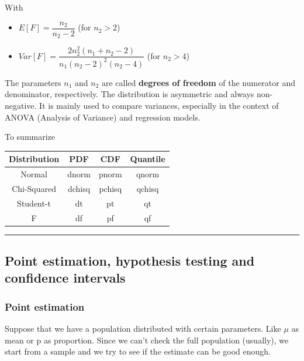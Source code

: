 With
\begin{itemize}
    \item $E[F] = \dfrac{n_2}{n_2 - 2}$ \quad (for $n_2 > 2$)
    \item $Var[F] = \dfrac{2n_2^2 (n_1 + n_2 - 2)}{n_1 (n_2 - 2)^2 (n_2 - 4)}$ \quad (for $n_2 > 4$)
\end{itemize}

The parameters $n_1$ and $n_2$ are called \textbf{degrees of freedom} of the numerator and denominator, respectively.  
The distribution is asymmetric and always non-negative.  
It is mainly used to compare variances, especially in the context of ANOVA (Analysis of Variance) and regression models.


\vspace{10pt}

To summarize

\begin{table}[h]
    \centering
    \begin{tabular}{|c|c|c|c|} %
        \hline %
        \textbf{Distribution} & \textbf{PDF}  & \textbf{CDF}  & \textbf{Quantile} \\
        \hline %
        Normal & dnorm & pnorm & qnorm \\
        \hline
        Chi-Squared & dchisq & pchisq & qchisq \\
        \hline
        Student-t & dt & pt & qt \\
        \hline
        F & df & pf & qf \\
        \hline %
    \end{tabular}
    \label{tab:distributions}
\end{table}

\vspace{10pt}

\hrule

\vspace{10pt}



\subsection{Point estimation, hypothesis testing and confidence intervals}
\subsubsection{Point estimation}
Suppose that we have a population distributed with certain parameters. Like $\mu$ as mean or p as proportion.
Since we can't check the full population (usually), we start from a sample and we try to see if the estimate can be good enough.

